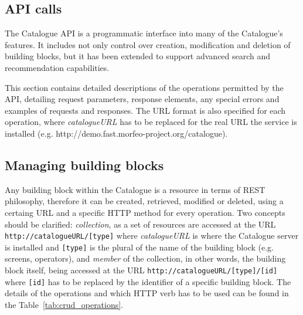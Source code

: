 \documentclass{fast_latex}
\begin{document}

\subsection{API calls} %
\label{sub:api_calls}

The Catalogue API is a programmatic interface into many of the Catalogue's features. It includes not only control over creation, modification and deletion of building blocks, but it has been extended to support advanced search and recommendation capabilities.

This section contains detailed descriptions of the operations permitted by the API, detailing request parameters, response elements, any special errors and examples of requests and responses. The URL format is also specified for each operation, where \emph{catalogueURL} has to be replaced for the real URL the service is installed (e.g. http://demo.fast.morfeo-project.org/catalogue).

\subsection{Managing building blocks} %
\label{sub:managing_building_blocks}

Any building block within the Catalogue is a resource in terms of REST philosophy, therefore it can be created, retrieved, modified or deleted, using a certaing URL and a specific HTTP method for every operation. Two concepts should be clarified: \emph{collection}, as a set of resources are accessed at the URL \verb|http://catalogueURL/[type]| where \emph{catalogueURL} is  where the Catalogue server is installed and \verb|[type]| is the plural of the name of the building block (e.g. screens, operators), and \emph{member} of the collection, in other words, the building block itself, being accessed at the URL \verb|http://catalogueURL/[type]/[id]| where \verb|[id]| has to be replaced by the identifier of a specific building block. The details of the operations and which HTTP verb has to be used can be found in the Table~\ref{tab:crud_operations}.
\end{document}
